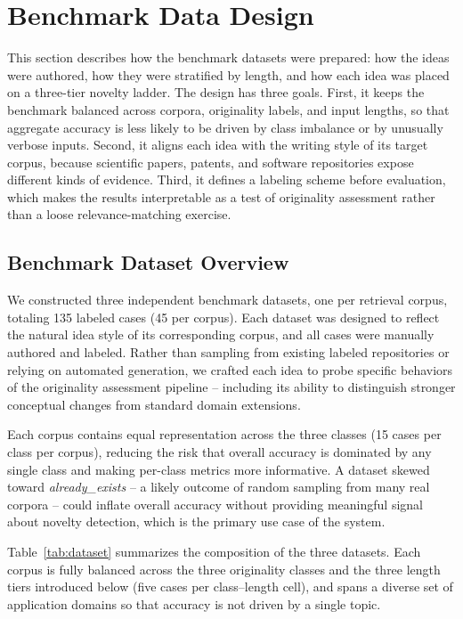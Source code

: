 \section{Benchmark Data Design}
\label{sec:benchmark}

This section describes how the benchmark datasets were prepared: how the ideas were authored, how they were stratified by length, and how each idea was placed on a three-tier novelty ladder. The design has three goals. First, it keeps the benchmark balanced across corpora, originality labels, and input lengths, so that aggregate accuracy is less likely to be driven by class imbalance or by unusually verbose inputs. Second, it aligns each idea with the writing style of its target corpus, because scientific papers, patents, and software repositories expose different kinds of evidence. Third, it defines a labeling scheme before evaluation, which makes the results interpretable as a test of originality assessment rather than a loose relevance-matching exercise.
 
\subsection{Benchmark Dataset Overview}
 
We constructed three independent benchmark datasets, one per retrieval corpus, totaling 135 labeled cases (45 per corpus). Each dataset was designed to reflect the natural idea style of its corresponding corpus, and all cases were manually authored and labeled. Rather than sampling from existing labeled repositories or relying on automated generation, we crafted each idea to probe specific behaviors of the originality assessment pipeline -- including its ability to distinguish stronger conceptual changes from standard domain extensions.
 
Each corpus contains equal representation across the three classes (15 cases per class per corpus), reducing the risk that overall accuracy is dominated by any single class and making per-class metrics more informative. A dataset skewed toward \textit{already\_exists} -- a likely outcome of random sampling from many real corpora -- could inflate overall accuracy without providing meaningful signal about novelty detection, which is the primary use case of the system.

Table~\ref{tab:dataset} summarizes the composition of the three datasets. Each corpus is fully balanced across the three originality classes and the three length tiers introduced below (five cases per class--length cell), and spans a diverse set of application domains so that accuracy is not driven by a single topic.

